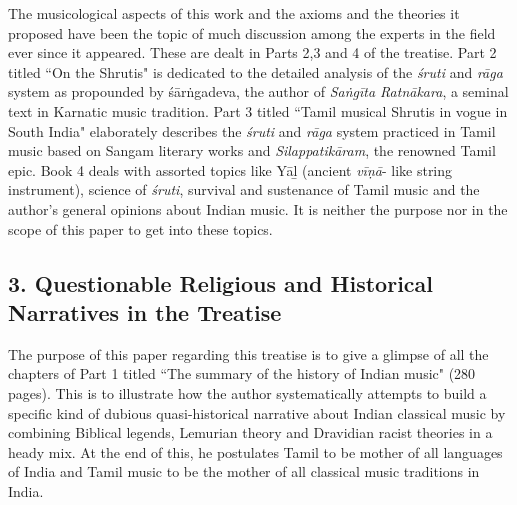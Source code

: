 The musicological aspects of this work and the axioms and the theories it proposed have been the topic of much discussion among the experts in the field ever since it appeared. These are dealt in Parts 2,3 and 4 of the treatise. Part 2 titled ``On the Shrutis" is dedicated to the detailed analysis of the \textit{śruti} and \textit{rāga} system as propounded by śārṅgadeva, the author of \textit{Saṅgīta Ratnākara}, a seminal text in Karnatic music tradition. Part 3 titled ``Tamil musical Shrutis in vogue in South India" elaborately describes the \textit{śruti} and \textit{rāga} system practiced in Tamil music based on Sangam literary works and \textit{Silappatikāram}, the renowned Tamil epic. Book 4 deals with assorted topics like Yāḻ (ancient \textit{vīṇā}- like string instrument), science of \textit{śruti}, survival and sustenance of Tamil music and the author's general opinions about Indian music. It is neither the purpose nor in the scope of this paper to get into these topics.

\vspace{-.3cm}

\subsection*{3. Questionable Religious and Historical Narratives in the Treatise}

\vspace{-.3cm}

The purpose of this paper regarding this treatise is to give a glimpse of all the chapters of Part 1 titled ``The summary of the history of Indian music" (280 pages). This is to illustrate how the author systematically attempts to build a specific kind of dubious quasi-historical narrative about Indian classical music by combining Biblical legends, Lemurian theory and Dravidian racist theories in a heady mix. At the end of this, he postulates Tamil to be mother of all languages of India and Tamil music to be the mother of all classical music traditions in India.


